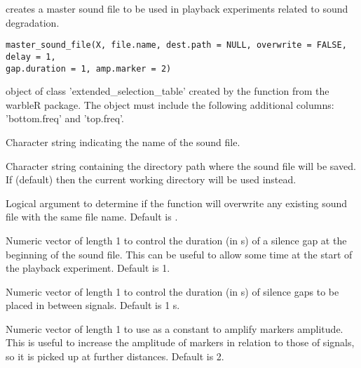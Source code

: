\documentclass[letterpaper]{book}
\begin{document}
%
\begin{Description}\relax
{} creates a master sound file to be used in playback experiments related to sound degradation.
\end{Description}
%
\begin{Usage}
\begin{verbatim}
master_sound_file(X, file.name, dest.path = NULL, overwrite = FALSE, delay = 1, 
gap.duration = 1, amp.marker = 2)
\end{verbatim}
\end{Usage}
%
\begin{Arguments}
\begin{ldescription}
\item[\code{X}] object of class 'extended\_selection\_table' created by the function  from the warbleR package. The object must include the following additional columns: 'bottom.freq' and 'top.freq'.

\item[\code{file.name}] Character string indicating the name of the sound file.

\item[\code{dest.path}] Character string containing the directory path where the sound file will be saved.
If  (default) then the current working directory will be used instead.

\item[\code{overwrite}] Logical argument to determine if the function will overwrite any existing sound file with the same file name. Default is .

\item[\code{delay}] Numeric vector of length 1 to control the duration (in s) of a silence gap at the beginning of the sound file. This can be useful to allow some time at the start of the playback experiment. Default is 1.

\item[\code{gap.duration}] Numeric vector of length 1 to control the duration (in s) of silence gaps to be placed in between signals. Default is 1 s.

\item[\code{amp.marker}] Numeric vector of length 1 to use as a constant to amplify markers amplitude. This is useful to increase the amplitude of markers in relation to those of signals, so it is picked up at further distances. Default is 2.
\end{ldescription}
\end{Arguments}
\end{document}
